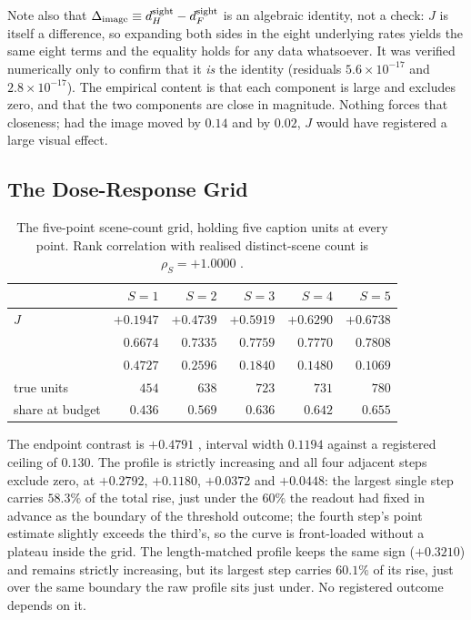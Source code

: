 Note also that $\Delta_{\mathrm{image}} \equiv d_{H}^{\mathrm{sight}} - d_{F}^{\mathrm{sight}}$ is an
algebraic identity, not a check: $J$ is itself a difference, so expanding both sides in the eight
underlying rates yields the same eight terms and the equality holds for any data whatsoever. It was
verified numerically only to confirm that it \emph{is} the identity (residuals $5.6\times10^{-17}$
and $2.8\times10^{-17}$). The empirical content is that each component is large and excludes zero,
and that the two components are close in magnitude. Nothing forces that closeness; had the image
moved \rateT{} by $0.14$ and \rateF{} by $0.02$, $J$ would have registered a large visual effect.

\subsection{The Dose-Response Grid}
\label{app:dose}

\begin{table}[htb]
\caption{The five-point scene-count grid, holding five caption units at every point. Rank correlation
with realised distinct-scene count is $\rho_S = +1.0000$ .}
\label{tab:dose}
\begin{center}
\small
\begin{tabular}{lrrrrr}
\toprule
 & $S{=}1$ & $S{=}2$ & $S{=}3$ & $S{=}4$ & $S{=}5$ \\
\midrule
$J$ & $+0.1947$ & $+0.4739$ & $+0.5919$ & $+0.6290$ & $+0.6738$ \\
\rateT{} & $0.6674$ & $0.7335$ & $0.7759$ & $0.7770$ & $0.7808$ \\
\rateF{} & $0.4727$ & $0.2596$ & $0.1840$ & $0.1480$ & $0.1069$ \\
true units & $454$ & $638$ & $723$ & $731$ & $780$ \\
share at budget & $0.436$ & $0.569$ & $0.636$ & $0.642$ & $0.655$ \\
\bottomrule
\end{tabular}
\end{center}
\end{table}

The endpoint contrast is $+0.4791$ , interval width $0.1194$ against a
registered ceiling of $0.130$. The profile is strictly increasing and all four adjacent steps exclude
zero, at $+0.2792$, $+0.1180$, $+0.0372$ and $+0.0448$: the largest single step carries $58.3\%$ of
the total rise, just under the $60\%$ the readout had fixed in advance as the boundary of the
threshold outcome; the fourth step's point estimate slightly exceeds the third's, so the curve is
front-loaded without a plateau inside the grid. The length-matched profile keeps the same sign ($+0.3210$)
and remains strictly increasing, but its largest step carries $60.1\%$ of its rise, just over the
same boundary the raw profile sits just under. No registered outcome depends on it.

